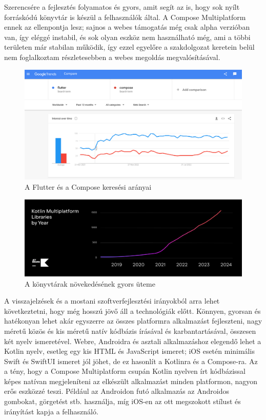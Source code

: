 Szerencsére a fejlesztés folyamatos és gyors, amit segít az is, hogy sok nyílt forráskódú könyvtár is készül a felhasználók által.\cite{KotlinMultiplatformStable}
A Compose Multiplatform ennek az ellenpontja lesz\cite{KotlinCrossPlatformFrameworks}; sajnos a webes támogatás még csak alpha verzióban van, így eléggé instabil, és sok olyan eszköz nem használható még, ami a többi területen már stabilan működik, így ezzel egyelőre a szakdolgozat keretein belül nem foglalkoztam részletesebben a webes megoldás megvalósításával.

\begin{figure}[!ht]
    \centering
    \includegraphics[width=150mm, keepaspectratio]{figures/flutter-vs-jetpack-compose-google-search-trends.png}
    \caption{A Flutter és a Compose keresési arányai \cite{FlutterVsCompose}}
    \label{fig:FlutterVsCompose}
\end{figure}

\begin{figure}[!ht]
    \centering
    \includegraphics[width=150mm, keepaspectratio]{figures/Libraries-2800x995.png}
    \caption{A könyvtárak növekedésének gyors üteme \cite{KotlinMultiplatformStable}}
    \label{fig:KMPLibraries}
\end{figure}

A visszajelzések és a mostani szoftverfejlesztési irányokból arra lehet következtetni, hogy még hosszú jövő áll a technológiák előtt.
Könnyen, gyorsan és hatékonyan lehet akár egyszerre az összes platformra alkalmazást fejleszteni, nagy méretű közös és kis méretű natív kódbázis írásával és karbantartásával, összesen két nyelv ismeretével.
Webre, Androidra és asztali alkalmazáshoz elegendő lehet a Kotlin nyelv, esetleg egy kis HTML és JavaScript ismeret; iOS esetén minimális Swift és SwiftUI ismeret jól jöhet, de ez hasonlít a Kotlinra és a Compose-ra.
Az a tény, hogy a Compose Multiplatform csupán Kotlin nyelven írt kódbázissal képes natívan megjeleníteni az elkészült alkalmazást minden platformon, nagyon erős eszközzé teszi.
Például az Androidon futó alkalmazás az Androidos gombokat, görgetést stb. használja, míg iOS-en az ott megszokott stílust és irányítást kapja a felhasználó.

